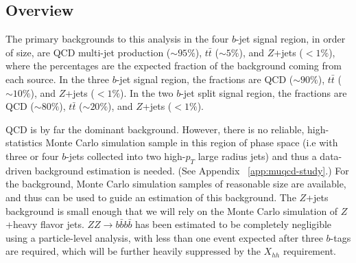 
\subsection{Overview}

The primary backgrounds to this analysis in the four $b$-jet signal region, in order of size, are QCD multi-jet production ($\sim 95\%$), $t\bar{t}$ ($\sim 5\%$), and $Z$+jets ($< 1\%$), where the percentages are the expected fraction of the background coming from each source. In the three $b$-jet signal region, the fractions are QCD ($\sim 90\%$), $t\bar{t}$ ($\sim 10\%$), and $Z$+jets ($< 1\%$).  In the two $b$-jet split signal region, the fractions are QCD ($\sim 80\%$), $t\bar{t}$ ($\sim 20\%$), and $Z$+jets ($< 1\%$).

QCD is by far the dominant background. However, there is no reliable, high-statistics Monte Carlo simulation sample in this region of phase space (i.e with three or four $b$-jets collected into two high-$p_{T}$ large radius jets) and thus a data-driven background estimation is needed. (See Appendix ~\ref{app:muqcd-study}.) For the \ttbar background, Monte Carlo simulation samples of reasonable size are available, and thus can be used to guide an estimation of this background. The $Z$+jets background is small enough that we will rely on the Monte Carlo simulation of $Z$+heavy flavor jets. $ZZ\to b\bar{b}b\bar{b}$ has been estimated to be completely negligible using a particle-level analysis, with less than one event expected after three $b$-tags are required, which will be further heavily suppressed by the $X_{hh}$ requirement.

